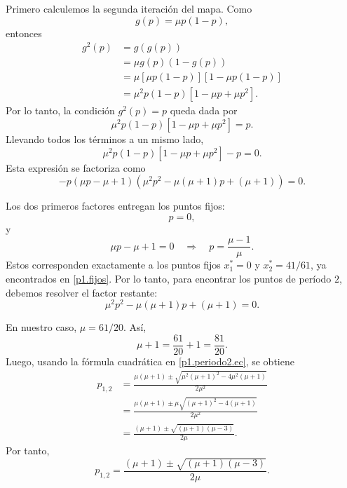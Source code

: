\documentclass[12pt]{article}
\begin{document}
Primero calculemos la segunda iteración del mapa. Como
\begin{equation*}
g(p)=\mu p(1-p),
\end{equation*}
entonces
\begin{align*}
g^2(p)
&=g(g(p))\\
&=\mu g(p)\left(1-g(p)\right)\\
&=\mu\left[\mu p(1-p)\right]\left[1-\mu p(1-p)\right]\\
&=\mu^2p(1-p)\left[1-\mu p+\mu p^2\right].
\end{align*}
Por lo tanto, la condición $g^2(p)=p$ queda dada por
\begin{equation*}
\mu^2p(1-p)\left[1-\mu p+\mu p^2\right]=p.
\end{equation*}
Llevando todos los términos a un mismo lado,
\begin{equation*}
\mu^2p(1-p)\left[1-\mu p+\mu p^2\right]-p=0.
\end{equation*}
Esta expresión se factoriza como
\begin{equation*}
-p\left(\mu p-\mu+1\right)
\left(\mu^2p^2-\mu(\mu+1)p+(\mu+1)\right)=0.
\end{equation*}

Los dos primeros factores entregan los puntos fijos:
\begin{equation*}
p=0,
\end{equation*}
y
\begin{equation*}
\mu p-\mu+1=0
\quad \Rightarrow \quad
p=\frac{\mu-1}{\mu}.
\end{equation*}
Estos corresponden exactamente a los puntos fijos $x_1^*=0$ y $x_2^*=41/61$, ya encontrados en \eqref{p1.fijos}. Por lo tanto, para encontrar los puntos de período $2$, debemos resolver el factor restante:
\begin{equation}\label{p1.periodo2.ec}
\mu^2p^2-\mu(\mu+1)p+(\mu+1)=0.
\end{equation}

En nuestro caso, $\mu=61/20$. Así,
\begin{equation*}
\mu+1=\frac{61}{20}+1=\frac{81}{20}.
\end{equation*}
Luego, usando la fórmula cuadrática en \eqref{p1.periodo2.ec}, se obtiene
\begin{align*}
p_{1,2}
&=
\frac{\mu(\mu+1)\pm
\sqrt{\mu^2(\mu+1)^2-4\mu^2(\mu+1)}}{2\mu^2}\\
&=
\frac{\mu(\mu+1)\pm
\mu\sqrt{(\mu+1)^2-4(\mu+1)}}{2\mu^2}\\
&=
\frac{(\mu+1)\pm
\sqrt{(\mu+1)(\mu-3)}}{2\mu}.
\end{align*}
Por tanto,
\begin{equation}\label{p1.p12}
    p_{1,2}=\frac{(\mu+1)\pm\sqrt{(\mu+1)(\mu-3)}}{2\mu}.
\end{equation}
\end{document}
